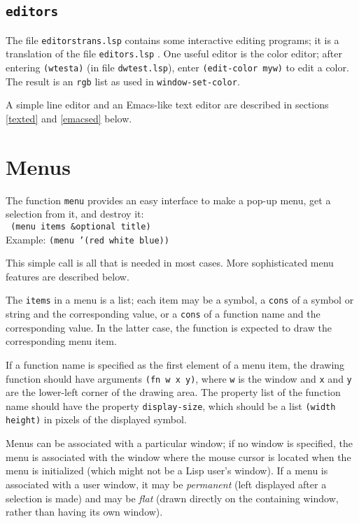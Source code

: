 \subsection{{\tt editors}}

The file {\tt editorstrans.lsp} contains some interactive editing programs;
it is a translation of the file {\tt editors.lsp} .
One useful editor is the color editor; after entering {\tt (wtesta)}
(in file {\tt dwtest.lsp}), enter {\tt (edit-color myw)} to edit a
color.  The result is an {\tt rgb} list as used in {\tt window-set-color}.

A simple line editor and an Emacs-like text editor are described in sections
\ref{texted}  and \ref{emacsed} below.

\section{Menus}

The function {\tt menu} provides an easy interface to make a pop-up menu,
get a selection from it, and destroy it: \\

\vspace{-0.2in}
{\tt \hspace*{0.5in} (menu items \&optional title)} \\

\vspace{-0.1in}
Example: {\tt (menu '(red white blue))}

This simple call is all that is needed in most cases.
More sophisticated menu features are described below.

The {\tt items} in a menu is a list; each item may be a symbol, a {\tt cons}
of a symbol or string and the corresponding value, or a {\tt cons} of a
function name and the corresponding value.  In the latter case, the function
is expected to draw the corresponding menu item.

If a function name is specified as the first element of a menu item, the
drawing function should have arguments {\tt (fn w x y)}, where {\tt w}
is the window and {\tt x} and {\tt y} are the lower-left corner of the
drawing area.  The property list of the function name should have the
property {\tt display-size}, which should be a list {\tt (width height)}
in pixels of the displayed symbol.

Menus can be associated with a particular window; if no window is specified,
the menu is associated with the window where the mouse cursor is located
when the menu is initialized (which might not be a Lisp user's window).  If a
menu is associated with a user window, it may be {\em permanent} (left
displayed after a selection is made) and may be {\em flat} (drawn directly
on the containing window, rather than having its own window).


